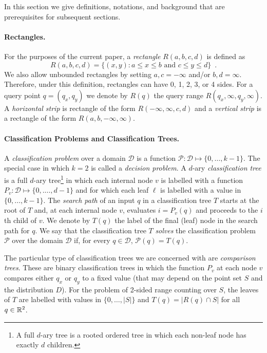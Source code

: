 \documentclass{patmorin}
\begin{document}
In this section we give definitions, notations, and background
that are prerequisites for subsequent sections.

\paragraph{Rectangles.}

For the purposes of the current paper, a \emph{rectangle}
$R(a,b,c,d)$ is defined as
\[
    R(a,b,c,d) = \{ (x,y) : \mbox{$a\le  x \le b$ and $c \le y \le d$}\}
	\enspace .
\]
We also allow unbounded rectangles by setting $a,c=-\infty$ and/or
$b,d=\infty$.  Therefore, under this definition, rectangles can have
0, 1, 2, 3, or 4 sides.  For a query point $q=(q_x,q_y)$ we denote 
by $R(q)$ the query range $R(q_x,\infty,q_y,\infty)$.  A
\emph{horizontal strip} is rectangle of the form
$R(-\infty,\infty,c,d)$ and a \emph{vertical strip} is a rectangle of
the form $R(a,b,-\infty,\infty)$.

\paragraph{Classification Problems and Classification Trees.}

A \emph{classification problem} over a domain $\mathcal{D}$ is a
function $\mathcal{P}:\mathcal{D}\mapsto \{0,\ldots,k-1\}$.  The
special case in which $k=2$ is called a \emph{decision problem}.  A
$d$-ary \emph{classification tree} is a full $d$-ary tree\footnote{A
full $d$-ary tree is a rooted ordered tree in which each non-leaf node
has exactly $d$ children.} in which each internal node $v$ is labelled
with a function $P_v:\mathcal{D}\mapsto\{0,.\ldots,d-1\}$ and for
which each leaf $\ell$ is labelled with a value
in $\{0,\ldots,k-1\}$. The \emph{search path} of an input $q$
in a classification tree $T$ starts at the root of $T$ and, at each
internal node $v$, evaluates $i=P_v(q)$ and proceeds to the $i$th
child of $v$.  We denote by $T(q)$ the label of the final (leaf) node
in the search path for $q$.  We say that the classification tree $T$
\emph{solves} the classification problem $\mathcal{P}$ over the domain
$\mathcal{D}$ if, for every $q\in \mathcal{D}$, $\mathcal{P}(q)=T(q)$.

The particular type of classification trees we are concerned with are
\emph{comparison trees}.  These are binary classification trees in
which the function $P_v$ at each node $v$ compares either $q_x$ or
$q_y$ to a fixed value (that may depend on the point set $S$ and the
distribution $D$).  For the problem of 2-sided range counting over
$S$, the leaves of $T$ are labelled with values in $\{0,\ldots,|S|\}$
and $T(q)=|R(q)\cap S|$ for all $q\in\mathbb{R}^2$.
\end{document}
